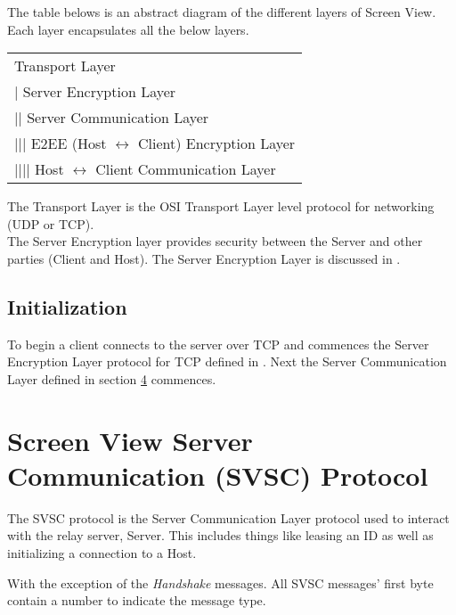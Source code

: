 \documentclass{article}
\newcommand{\projectName}{Screen View}
\begin{document}
    The table belows is an abstract diagram of the different layers of \projectName. Each layer encapsulates all the
    below layers.

    \begin{center}
        \begin{tabular}{|l|}
            \hline
            Transport Layer                                           \\
            | Server Encryption Layer                                 \\
            || Server Communication Layer                             \\
            ||| E2EE (Host $\leftrightarrow$ Client) Encryption Layer \\
            |||| Host $\leftrightarrow$ Client Communication Layer    \\
            \hline
        \end{tabular}
    \end{center}

    The Transport Layer is the OSI Transport Layer level protocol for networking (UDP or TCP). \\

    The Server Encryption layer provides security between the Server and other parties (Client and Host). The Server
    Encryption Layer is discussed in %
    .

    \subsection{Initialization}

    To begin a client connects to the server over TCP and commences the Server Encryption Layer protocol for TCP
    defined in %
    . Next the Server Communication Layer defined in section \hyperlink{section.4}{4} commences.

    \newpage


    \section{Screen View Server Communication (SVSC) Protocol }

    The SVSC protocol is the Server Communication Layer protocol used to interact with the relay server, Server. This
    includes things like leasing an ID as well as initializing a connection to a Host.

    With the exception of the \emph{Handshake} messages. All SVSC messages' first byte contain a number to indicate
    the message type.
\end{document}
